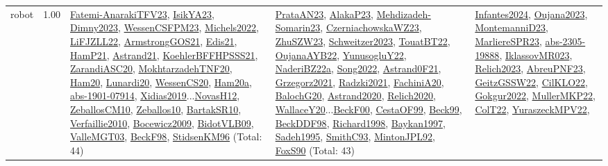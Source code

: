{\begin{longtable}{p{3cm}r>{\raggedright\arraybackslash}p{6cm}>{\raggedright\arraybackslash}p{6cm}>{\raggedright\arraybackslash}p{8cm}}
\index{robot}\index{ApplicationAreas!robot}robot &  1.00 & \hyperref[detail:Fatemi-AnarakiTFV23]{Fatemi-AnarakiTFV23}, \hyperref[detail:IsikYA23]{IsikYA23}, \hyperref[detail:Dimny2023]{Dimny2023}, \hyperref[detail:WessenCSFPM23]{WessenCSFPM23}, \hyperref[detail:Michels2022]{Michels2022}, \hyperref[detail:LiFJZLL22]{LiFJZLL22}, \hyperref[detail:ArmstrongGOS21]{ArmstrongGOS21}, \hyperref[detail:Edis21]{Edis21}, \hyperref[detail:HamP21]{HamP21}, \hyperref[detail:Astrand21]{Astrand21}, \hyperref[detail:KoehlerBFFHPSSS21]{KoehlerBFFHPSSS21}, \hyperref[detail:ZarandiASC20]{ZarandiASC20}, \hyperref[detail:MokhtarzadehTNF20]{MokhtarzadehTNF20}, \hyperref[detail:Ham20]{Ham20}, \hyperref[detail:Lunardi20]{Lunardi20}, \hyperref[detail:WessenCS20]{WessenCS20}, \hyperref[detail:Ham20a]{Ham20a}, \hyperref[detail:abs-1901-07914]{abs-1901-07914}, \hyperref[detail:Xidias2019]{Xidias2019}...\hyperref[detail:NovasH12]{NovasH12}, \hyperref[detail:ZeballosCM10]{ZeballosCM10}, \hyperref[detail:Zeballos10]{Zeballos10}, \hyperref[detail:BartakSR10]{BartakSR10}, \hyperref[detail:Verfaillie2010]{Verfaillie2010}, \hyperref[detail:Bocewicz2009]{Bocewicz2009}, \hyperref[detail:BidotVLB09]{BidotVLB09}, \hyperref[detail:ValleMGT03]{ValleMGT03}, \hyperref[detail:BeckF98]{BeckF98}, \hyperref[detail:StidsenKM96]{StidsenKM96} (Total: 44) & \hyperref[detail:PrataAN23]{PrataAN23}, \hyperref[detail:AlakaP23]{AlakaP23}, \hyperref[detail:Mehdizadeh-Somarin23]{Mehdizadeh-Somarin23}, \hyperref[detail:CzerniachowskaWZ23]{CzerniachowskaWZ23}, \hyperref[detail:ZhuSZW23]{ZhuSZW23}, \hyperref[detail:Schweitzer2023]{Schweitzer2023}, \hyperref[detail:TouatBT22]{TouatBT22}, \hyperref[detail:OujanaAYB22]{OujanaAYB22}, \hyperref[detail:YunusogluY22]{YunusogluY22}, \hyperref[detail:NaderiBZ22a]{NaderiBZ22a}, \hyperref[detail:Song2022]{Song2022}, \hyperref[detail:Astrand0F21]{Astrand0F21}, \hyperref[detail:Grzegorz2021]{Grzegorz2021}, \hyperref[detail:Radzki2021]{Radzki2021}, \hyperref[detail:FachiniA20]{FachiniA20}, \hyperref[detail:BalochG20]{BalochG20}, \hyperref[detail:Astrand2020]{Astrand2020}, \hyperref[detail:Relich2020]{Relich2020}, \hyperref[detail:WallaceY20]{WallaceY20}...\hyperref[detail:BeckF00]{BeckF00}, \hyperref[detail:CestaOF99]{CestaOF99}, \hyperref[detail:Beck99]{Beck99}, \hyperref[detail:BeckDDF98]{BeckDDF98}, \hyperref[detail:Richard1998]{Richard1998}, \hyperref[detail:Baykan1997]{Baykan1997}, \hyperref[detail:Sadeh1995]{Sadeh1995}, \hyperref[detail:SmithC93]{SmithC93}, \hyperref[detail:MintonJPL92]{MintonJPL92}, \hyperref[detail:FoxS90]{FoxS90} (Total: 43) & \hyperref[detail:Infantes2024]{Infantes2024}, \hyperref[detail:Oujana2023]{Oujana2023}, \hyperref[detail:MontemanniD23]{MontemanniD23}, \hyperref[detail:MarliereSPR23]{MarliereSPR23}, \hyperref[detail:abs-2305-19888]{abs-2305-19888}, \hyperref[detail:IklassovMR023]{IklassovMR023}, \hyperref[detail:Relich2023]{Relich2023}, \hyperref[detail:AbreuPNF23]{AbreuPNF23}, \hyperref[detail:GeitzGSSW22]{GeitzGSSW22}, \hyperref[detail:CilKLO22]{CilKLO22}, \hyperref[detail:Gokgur2022]{Gokgur2022}, \hyperref[detail:MullerMKP22]{MullerMKP22}, \hyperref[detail:ColT22]{ColT22}, \hyperref[detail:YuraszeckMPV22]{YuraszeckMPV22}, 
\end{longtable}}
